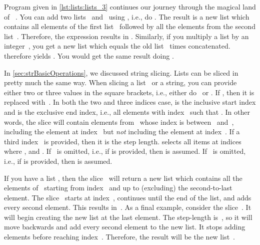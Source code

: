 Program  given in \cref{lst:lists:lists_3} continues our journey through the magical land of \python\ .
You can add two lists~ and~ using \pythonilIdx{+}, i.e., do .
The result is a new list which contains all elements of the first list~ followed by all the elements from the second list~.
Therefore, the expression \pythonil{[1, 2, 3, 4] + [5, 6, 7]} results in \pythonil{[1, 2, 3, 4, 5, 6, 7]}.
Similarly, if you multiply a list by an integer~, you get a new list which equals the old list ~times concatenated.
 therefore yields \pythonil{[5, 6, 7, 5, 6, 7, 5, 6, 7]}.
You would get the same result doing .

In \cref{sec:strBasicOperations}, we discussed string slicing.
Lists can be sliced in pretty much the same way.
When slicing a list~ or a string, you can provide either two or three values in the square brackets\pythonIdx{[\idxdots]}\pythonIdx{[i:j:k]}, i.e., either do~\pythonIdx{[i:j]} or .
If , then it is replaced with~.
In both the two and three indices case,  is the inclusive start index and  is the exclusive end index, i.e., all elements with index~ such that .
In other words, the slice will contain elements from~ whose index is between~ and~, including the element at index~ but \emph{not} including the element at index~.
If a third index~ is provided, then it is the step length.
 selects all items at indices~ where ,  and .
If~ is omitted, i.e., if  is provided, then  is assumed.
If~ is omitted, i.e., if  is provided, then  is assumed.

If you have a list , then the slice~ will return a new list which contains all the elements of~ starting from index~ and up to (excluding) the second-to-last element.
The slice~ starts at index~, continues until the end of the list, and adds every second element.
This results in~\pythonil{[6, 5, 7, 6]}.
As a final example, consider the slice~.
It will begin creating the new list at the last element.
The step-length is~, so it will move backwards and add every second element to the new list.
It stops adding elements before reaching index~.
Therefore, the result will be the new list~.

